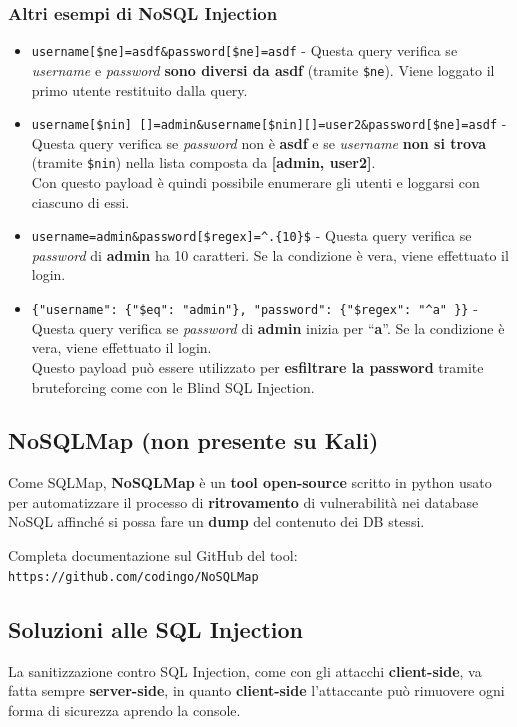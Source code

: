 \documentclass{article}
\begin{document}
\subsubsection{Altri esempi di NoSQL Injection}
\begin{itemize}
	\item \verb|username[$ne]=asdf&password[$ne]=asdf| - Questa query verifica se \textit{username} e \textit{password} \textbf{sono diversi da asdf} (tramite \verb|$ne|). Viene loggato il primo utente restituito dalla query.
	
	\item \verb|username[$nin] []=admin&username[$nin][]=user2&password[$ne]=asdf| - Questa query verifica se \textit{password} non è \textbf{asdf} e se \textit{username} \textbf{non si trova} (tramite \verb|$nin|) nella lista composta da \textbf{[admin, user2]}.\\ Con questo payload è quindi possibile enumerare gli utenti e loggarsi con ciascuno di essi.
	
	\item \verb|username=admin&password[$regex]=^.{10}$| - Questa query verifica se \textit{password} di \textbf{admin} ha 10 caratteri. Se la condizione è vera, viene effettuato il login.
	
	\item \verb|{"username": {"$eq": "admin"}, "password": {"$regex": "^a" }}| - Questa query verifica se \textit{password} di \textbf{admin} inizia per “\textbf{a}”. Se la condizione è vera, viene effettuato il login.\\
	Questo payload può essere utilizzato per \textbf{esfiltrare la password} tramite bruteforcing come con le Blind SQL Injection.
\end{itemize}

\subsection{NoSQLMap (non presente su Kali)}
Come SQLMap, \textbf{NoSQLMap} è un \textbf{tool open-source} scritto in python usato per automatizzare il processo di \textbf{ritrovamento} di vulnerabilità nei database NoSQL affinché si possa fare un \textbf{dump} del contenuto dei DB stessi.

Completa documentazione sul GitHub del tool:
\verb|https://github.com/codingo/NoSQLMap|

\subsection{Soluzioni alle SQL Injection}
La sanitizzazione contro SQL Injection, come con gli attacchi \textbf{client-side}, va fatta sempre \textbf{server-side}, in quanto \textbf{client-side} l'attaccante può rimuovere ogni forma di sicurezza aprendo la console.
\end{document}
